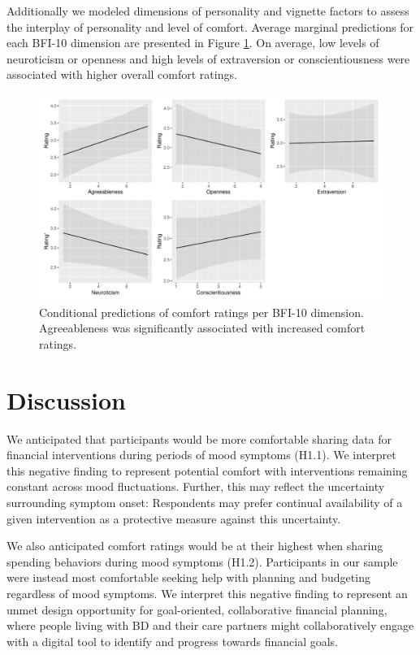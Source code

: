 \documentclass[10pt]{article}
\begin{document}
Additionally we modeled dimensions of personality and vignette factors to assess the interplay of personality and level of comfort. Average marginal predictions for each BFI-10 dimension are presented in Figure \ref{fig:expl_bfi10_marginal_predictions}. On average, low levels of neuroticism or openness and high levels of extraversion or conscientiousness were associated with higher overall comfort ratings.

\begin{figure}[!ht]
  \centering
  \includegraphics[scale=0.5]{figures/expl_bfi10_marginal_predictions.pdf}
  \caption{Conditional predictions of comfort ratings per BFI-10 dimension. Agreeableness was significantly associated with increased comfort ratings.}
  \label{fig:expl_bfi10_marginal_predictions}
\end{figure}


\section{Discussion}

We anticipated that participants would be more comfortable sharing data for financial interventions during periods of mood symptoms (H1.1). We interpret this negative finding to represent potential comfort with interventions remaining constant across mood fluctuations. Further, this may reflect the uncertainty surrounding symptom onset: Respondents may prefer continual availability of a given intervention as a protective measure against this uncertainty. 

We also anticipated comfort ratings would be at their highest when sharing spending behaviors during mood symptoms (H1.2). Participants in our sample were instead most comfortable seeking help with planning and budgeting regardless of mood symptoms. We interpret this negative finding to represent an unmet design opportunity for goal-oriented, collaborative financial planning, where people living with BD and their care partners might collaboratively engage with a digital tool to identify and progress towards financial goals. 
\end{document}
